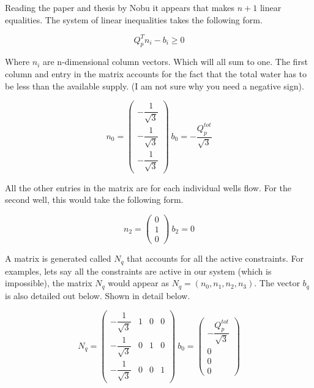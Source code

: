 \documentclass{article}
\begin{document}
Reading the paper and thesis by Nobu it appears that makes $n+1$ linear equalities. The system of linear inequalities takes the following form.

\begin{equation*}
    Q_{p}^{T}n_{i} - b_{i} \geq 0 
\end{equation*}

Where $n_{i}$ are n-dimensional column vectors. Which will all sum to one. The first column and entry in the matrix accounts for the fact that the total water has to be less than the available supply. (I am not sure why you need a negative sign).

\begin{equation*}
    n_{0} = 
    \begin{pmatrix}
    -\dfrac{1}{\sqrt{3}} \\[10pt]
    -\dfrac{1}{\sqrt{3}} \\[10pt]
    -\dfrac{1}{\sqrt{3}}
    \end{pmatrix} \:
    b_{0} = -\dfrac{Q_{p}^{tot}}{\sqrt{3}}
\end{equation*}

All the other entries in the matrix are for each individual wells flow. For the second well, this would take the following form.

\begin{equation*}
    n_{2} = 
    \begin{pmatrix}
    0 \\
    1 \\
    0
    \end{pmatrix} \:
    b_{2} = 0
\end{equation*}

A matrix is generated called $N_{q}$ that accounts for all the active constraints. For examples, lets say all the constraints are active in our system (which is impossible), the matrix $N_{q}$ would appear as $N_{q} = (n_{0}, n_{1}, n_{2}, n_{3})$. The vector $b_{q}$ is also detailed out below. Shown in detail below.

\begin{equation*}
    N_{q} = 
    \begin{pmatrix}
    -\dfrac{1}{\sqrt{3}} & 1 & 0 & 0 \\[10pt]
    -\dfrac{1}{\sqrt{3}} & 0 & 1 & 0\\[10pt]
    -\dfrac{1}{\sqrt{3}} & 0 & 0 & 1
    \end{pmatrix} \:
    b_{0} = 
    \begin{pmatrix}
    -\dfrac{Q_{p}^{tot}}{\sqrt{3}} \\[10pt]
    0 \\[10pt]
    0 \\[10pt]
    0
    \end{pmatrix}
\end{equation*}
\end{document}
